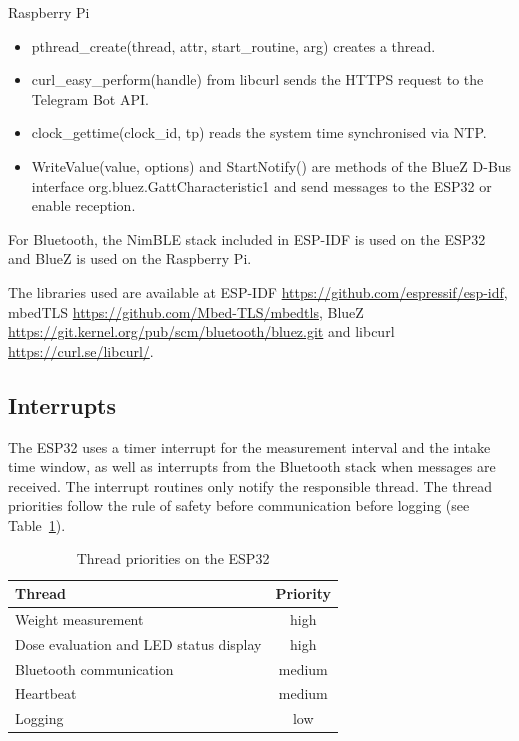 Raspberry Pi
	\begin{itemize}
		\item pthread\_create(thread, attr, start\_routine, arg) creates a
		thread.
		\item curl\_easy\_perform(handle) from libcurl sends the HTTPS request
		to the Telegram Bot API.
		\item clock\_gettime(clock\_id, tp) reads the system time synchronised
		via NTP.
		\item WriteValue(value, options) and StartNotify() are methods of the
		BlueZ D-Bus interface org.bluez.GattCharacteristic1 and send messages
		to the ESP32 or enable reception.
	\end{itemize}

For Bluetooth, the NimBLE stack included in ESP-IDF is used on the ESP32 and
BlueZ is used on the Raspberry Pi.

The libraries used are available at ESP-IDF
\url{https://github.com/espressif/esp-idf}, mbedTLS
\url{https://github.com/Mbed-TLS/mbedtls}, BlueZ
\url{https://git.kernel.org/pub/scm/bluetooth/bluez.git} and libcurl
\url{https://curl.se/libcurl/}.

\subsection{Interrupts}

The ESP32 uses a timer interrupt for the measurement interval and the intake
time window, as well as interrupts from the Bluetooth stack when messages are
received. The interrupt routines only notify the responsible thread. The
thread priorities follow the rule of safety before communication before
logging (see Table~\ref{tab:prio}).

\begin{table}[H]
	\centering
	\begin{tabular}{|l|c|}
		\hline
		Thread & Priority \\
		\hline
		Weight measurement & high \\
		Dose evaluation and LED status display & high \\
		Bluetooth communication & medium \\
		Heartbeat & medium \\
		Logging & low \\
		\hline
	\end{tabular}
	\caption{Thread priorities on the ESP32}
	\label{tab:prio}
\end{table}

